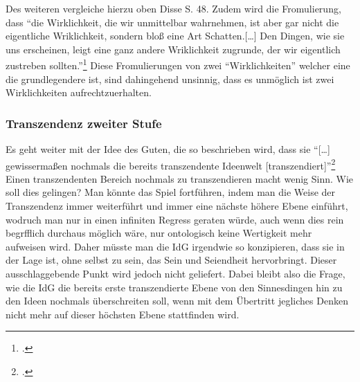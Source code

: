 Des weiteren vergleiche hierzu oben Disse S. 48.
Zudem wird die Fromulierung, dass \enquote{die Wirklichkeit, die wir unmittelbar wahrnehmen, ist aber gar nicht die eigentliche Wriklichkeit, sondern bloß eine Art Schatten.[\dots] Den Dingen, wie sie uns erscheinen, leigt eine ganz andere Wriklichkeit zugrunde, der wir eigentlich zustreben sollten.}\footcite[][S. 23]{DisseMetaphysik}
Diese Fromulierungen von zwei \enquote{Wirklichkeiten} welcher eine die grundlegendere ist, sind dahingehend unsinnig, dass es unmöglich ist zwei Wirklichkeiten aufrechtzuerhalten.

\subsubsection{Transzendenz zweiter Stufe}
Es geht weiter mit der Idee des Guten, die so beschrieben wird, dass sie \enquote{[\dots] gewissermaßen nochmals die bereits transzendente Ideenwelt [transzendiert]}\footcite[vgl.][S. 50]{DisseMetaphysik}
Einen transzendenten Bereich nochmals zu transzendieren macht wenig Sinn. Wie soll dies gelingen? 
Man könnte das Spiel fortführen, indem man die Weise der Transzendenz immer weiterführt und immer eine nächste höhere Ebene einführt, wodruch man nur in einen infiniten Regress geraten würde, auch wenn dies rein begrfflich durchaus möglich wäre, nur ontologisch keine Wertigkeit mehr aufweisen wird. Daher müsste man die IdG irgendwie so konzipieren, dass sie in der Lage ist, ohne selbst zu sein, das Sein und Seiendheit hervorbringt. Dieser ausschlaggebende Punkt wird jedoch nicht geliefert. Dabei bleibt also die Frage, wie die IdG die bereits erste transzendierte Ebene von den Sinnesdingen hin zu den Ideen nochmals überschreiten soll, wenn mit dem Übertritt jegliches Denken nicht mehr auf dieser höchsten Ebene stattfinden wird. 

